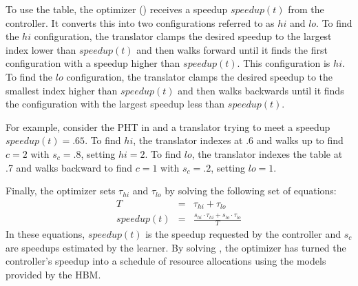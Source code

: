 To use the table, the optimizer () receives a
speedup $speedup(t)$ from the controller.  It converts this into two
configurations referred to as $hi$ and $lo$.  To find the $hi$
configuration, the translator clamps the desired speedup to the
largest index lower than $speedup(t)$ and then walks forward until it
finds the first configuration with a speedup higher than $speedup(t)$.
This configuration is $hi$.  To find the $lo$ configuration, the
translator clamps the desired speedup to the smallest index higher
than $speedup(t)$ and then walks backwards until it finds the
configuration with the largest speedup less than $speedup(t)$.

For example, consider the PHT in  and a translator trying
to meet a speedup $speedup(t) = .65$.  To find $hi$, the translator
indexes at .6 and walks up to find $c=2$ with $s_c=.8$, setting $hi =
2$.  To find $lo$, the translator indexes the table at .7 and walks
backward to find $c=1$ with $s_c=.2$, setting $lo = 1$.

Finally, the optimizer sets $\tau_{hi}$ and $\tau_{lo}$ by solving the
following set of equations:
\begin{eqnarray}
  T &=& \tau_{hi} + \tau_{lo}    \label{eqn:s1} \\
  speedup(t) &=& \frac{s_{hi} \cdot \tau_{hi} + s_{lo} \cdot \tau_{lo}}{T} \label{eqn:s2}
\end{eqnarray}
In these equations, $speedup(t)$ is the speedup requested by the
controller and $s_c$ are speedups estimated by the learner.  By
solving , the optimizer has turned the controller's
speedup into a schedule of resource allocations using the models
provided by the HBM.



